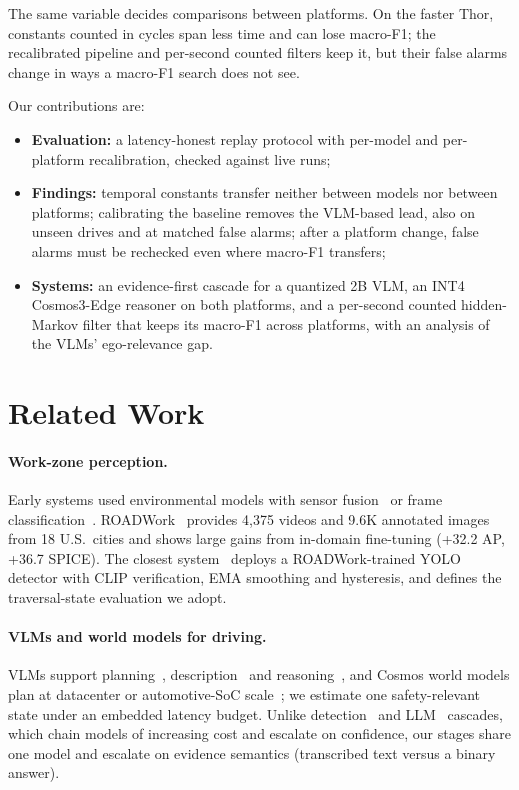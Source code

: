 \documentclass[conference]{IEEEtran}
\begin{document}
The same variable decides comparisons between platforms.  On the faster Thor, constants counted in cycles span less time and can lose macro-F1; the recalibrated pipeline and per-second counted filters keep it, but their false alarms change in ways a macro-F1 search does not see.

Our contributions are:
\begin{itemize}
\item \textbf{Evaluation:} a latency-honest replay protocol with per-model and per-platform recalibration, checked against live runs;
\item \textbf{Findings:} temporal constants transfer neither between models nor between platforms; calibrating the baseline removes the VLM-based lead, also on unseen drives and at matched false alarms; after a platform change, false alarms must be rechecked even where macro-F1 transfers;
\item \textbf{Systems:} an evidence-first cascade for a quantized 2B VLM, an INT4 Cosmos3-Edge reasoner on both platforms, and a per-second counted hidden-Markov filter that keeps its macro-F1 across platforms, with an analysis of the VLMs' ego-relevance gap.
\end{itemize}

\section{Related Work}
\label{sec:related}

\paragraph{Work-zone perception.} Early systems used environmental models with sensor fusion~\cite{shi2021workzone} or frame classification~\cite{abodo2018shrp}.  ROADWork~\cite{ghosh2025roadwork} provides 4{,}375 videos and 9.6K annotated images from 18 U.S.\ cities and shows large gains from in-domain fine-tuning (+32.2 AP, +36.7 SPICE).  The closest system~\cite{priorsystem2026} deploys a ROADWork-trained YOLO detector with CLIP verification, EMA smoothing and hysteresis, and defines the traversal-state evaluation we adopt.

\paragraph{VLMs and world models for driving.} VLMs support planning~\cite{hwang2024emma,tian2024drivevlm}, description~\cite{marcu2024lingoqa} and reasoning~\cite{nvidia2025cosmosreason}, and Cosmos world models plan at datacenter or automotive-SoC scale~\cite{nvidia2026cosmos3,alpamayo2026}; we estimate one safety-relevant state under an embedded latency budget.  Unlike detection~\cite{viola2001rapid} and LLM~\cite{chen2023frugalgpt} cascades, which chain models of increasing cost and escalate on confidence, our stages share one model and escalate on evidence semantics (transcribed text versus a binary answer).
\end{document}
